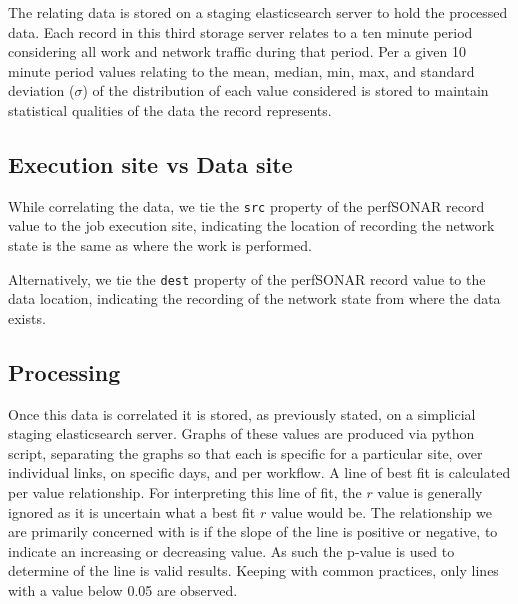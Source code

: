 \documentclass[sigconf]{acmart}
\begin{document}
The relating data is stored on a staging elasticsearch server to hold the processed data. Each record in this third storage server relates to a ten minute period considering all work and network traffic during that period. Per a given 10 minute period values relating to the mean, median, min, max, and standard deviation ($\sigma$) of the distribution of each value considered is stored to maintain statistical qualities of the data the record represents.
\subsection{Execution site vs Data site}
While correlating the data, we tie the \texttt{src} property of the perfSONAR record value to the job execution site, indicating the location of recording the network state is the same as where the work is performed.

Alternatively, we tie the \texttt{dest} property of the perfSONAR record value to the data location, indicating the recording of the network state from where the data exists.
\subsection{Processing}
Once this data is correlated it is stored, as previously stated, on a simplicial staging elasticsearch server. Graphs of these values are produced via python script, separating the graphs so that each is specific for a particular site, over individual links, on specific days, and per workflow. A line of best fit is calculated per value relationship. For interpreting this line of fit, the $r$ value is generally ignored as it is uncertain what a best fit $r$ value would be. The relationship we are primarily concerned with is if the slope of the line is positive or negative, to indicate an increasing or decreasing value. As such the p-value is used to determine of the line is valid results. Keeping with common practices, only lines with a value below 0.05 are observed.
\end{document}
